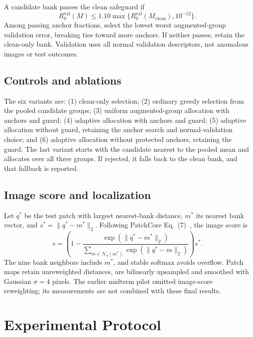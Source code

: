 \documentclass[10pt,twocolumn,letterpaper]{article}
\begin{document}
A candidate bank passes the clean safeguard if
\begin{equation}
 R_0^{\mathrm{val}}(M)\leq1.10\max\{R_0^{\mathrm{val}}(M_{\mathrm{clean}}),10^{-12}\}.
\end{equation}
Among passing anchor fractions, select the lowest worst augmented-group validation error, breaking ties toward more anchors. If neither passes, retain the clean-only bank. Validation uses all normal validation descriptors, not anomalous images or test outcomes.

\subsection{Controls and ablations}
The six variants are: (1) clean-only selection; (2) ordinary greedy selection from the pooled candidate groups; (3) uniform augmented-group allocation with anchors and guard; (4) adaptive allocation with anchors and guard; (5) adaptive allocation without guard, retaining the anchor search and normal-validation choice; and (6) adaptive allocation without protected anchors, retaining the guard. The last variant starts with the candidate nearest to the pooled mean and allocates over all three groups. If rejected, it falls back to the clean bank, and that fallback is reported.

\subsection{Image score and localization}
Let $q^*$ be the test patch with largest nearest-bank distance, $m^*$ its nearest bank vector, and $s^*=\|q^*-m^*\|_2$. Following PatchCore Eq.~(7)~\cite{roth2022}, the image score is
\begin{equation}
 s=\left(1-\frac{\exp(\|q^*-m^*\|_2)}{\sum_{m\in\mathcal{N}_9(m^*)}\exp(\|q^*-m\|_2)}\right)s^*.
\end{equation}
The nine bank neighbors include $m^*$, and stable softmax avoids overflow. Patch maps retain unreweighted distances, are bilinearly upsampled and smoothed with Gaussian $\sigma=4$ pixels. The earlier midterm pilot omitted image-score reweighting; its measurements are not combined with these final results.

\section{Experimental Protocol}
\end{document}
